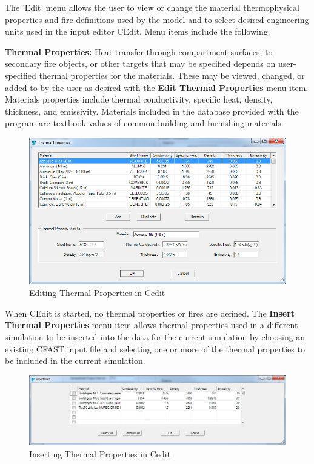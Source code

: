 The 'Edit' menu allows the user to view or change the material thermophysical properties and fire definitions used by the model and to select desired engineering units used in the input editor CEdit. Menu items include the following.

\textbf{Thermal Properties:} Heat transfer through compartment surfaces, to secondary fire objects, or other targets that may be specified depends on user-specified thermal properties for the materials.  These may be viewed, changed, or added to by the user as desired with the \textbf{Edit Thermal Properties} menu item. Materials properties include thermal conductivity, specific heat, density, thickness, and emissivity. Materials included in the database provided with the program are textbook values of common building and furnishing materials.

\begin{figure}[h!]
\begin{center}
\includegraphics[width=6.5in]{FIGURES/Running_CFAST/Thermal_Properties_Edit}
Editing Thermal Properties in Cedit
\end{center}
\end{figure}

When CEdit is started, no thermal properties or fires are defined.  The \textbf{Insert Thermal Properties} menu item allows thermal properties used in a different simulation to be inserted into the data for the current simulation by choosing an existing CFAST input file and selecting one or more of the thermal properties to be included in the current simulation.

\begin{figure}[h!]
\begin{center}
\includegraphics[width=6.5in]{FIGURES/Running_CFAST/Thermal_Properties_Insert}
Inserting Thermal Properties in Cedit
\end{center}
\end{figure}

